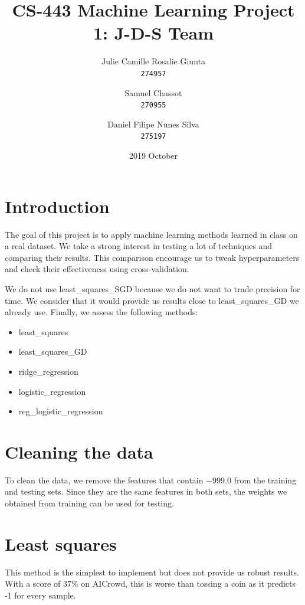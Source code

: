 \documentclass[11pt, a4paper, twocolumn]{article}
\begin{document}
\date{2019 October}
\title{CS-443 Machine Learning Project 1: J-D-S Team}
\author{
  Julie Camille Rosalie Giunta\\
  \texttt{274957}
  \and
  Samuel Chassot\\
  \texttt{270955}
  \and
  Daniel Filipe Nunes Silva\\
  \texttt{275197}
}

\maketitle
\clearpage

\section{Introduction}
The goal of this project is to apply machine learning
methods learned in class on a real dataset. We take a
strong interest in testing a lot of techniques and
comparing their results. This comparison encourage us to
tweak hyperparameters and check their effectiveness using cross-validation.

We do not use least\_squares\_SGD because we do not want
to trade precision for time. We consider
that it would provide us results close to
least\_squares\_GD we already use. Finally, we assess the following
methods:

\begin{itemize}
  \setlength{\itemsep}{1pt}
  \setlength{\parskip}{0pt}
  \setlength{\parsep}{0pt}
  \item least\_squares
  \item least\_squares\_GD 
  \item ridge\_regression
  \item logistic\_regression
  \item reg\_logistic\_regression
\end{itemize}

\section{Cleaning the data}
To clean the data, we remove the features
that contain $-999.0$ from the training and testing sets. 
Since they are the same features in both sets, 
the weights we obtained from training can be used for testing.

\section{Least squares}
This method is the simplest to implement but does not
provide us robust results. With a score of 37\% on
AICrowd, this is worse than tossing a coin as it predicts -1 for every sample. 
\end{document}

